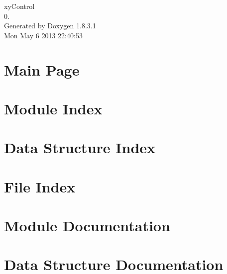 \documentclass{book}
\begin{document}
\hypersetup{pageanchor=false,citecolor=blue}
\begin{titlepage}
\vspace*{7cm}
\begin{center}
{\Large xy\-Control \\[1ex]\large 0. }\\
\vspace*{1cm}
{\large Generated by Doxygen 1.8.3.1}\\
\vspace*{0.5cm}
{\small Mon May 6 2013 22:40:53}\\
\end{center}
\end{titlepage}
\clearemptydoublepage
{}
\tableofcontents
\clearemptydoublepage
{}
\hypersetup{pageanchor=true,citecolor=blue}
\chapter{Main Page}
\label{index}\hypertarget{index}{}
\chapter{Module Index}

\chapter{Data Structure Index}

\chapter{File Index}

\chapter{Module Documentation}

























\chapter{Data Structure Documentation}








\end{document}
